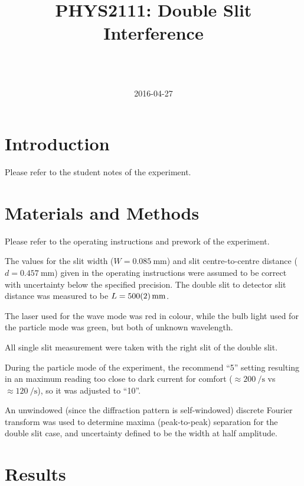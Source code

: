 \documentclass[a4paper]{scrartcl}
\begin{document}
\title{PHYS2111: Double Slit Interference}
\author{ \\ \\ }
\date{2016-04-27}
\maketitle

\section{Introduction}
Please refer to the student notes of the experiment.

\section{Materials and Methods}
Please refer to the operating instructions and prework of the experiment.

The values for the slit width (\(W = \SI{0.085}{\milli\metre}\)) and slit centre-to-centre distance (\(d = \SI{0.457}{\milli\metre}\)) given in the operating instructions were assumed to be correct with uncertainty below the specified precision. The double slit to detector slit distance was measured to be \(L = \SI{500 \pm 2}{\milli\metre}\).

The laser used for the wave mode was red in colour, while the bulb light used for the particle mode was green, but both of unknown wavelength.

All single slit measurement were taken with the right slit of the double slit.

During the particle mode of the experiment, the recommend ``5'' setting resulting in an maximum reading too close to dark current for comfort (\(\approx\SI{200}{\per\second}\) vs \(\approx\SI{120}{\per\second}\)), so it was adjusted to ``10''.

An unwindowed (since the diffraction pattern is self-windowed) discrete Fourier transform was used to determine maxima (peak-to-peak) separation for the double slit case, and uncertainty defined to be the width at half amplitude.

\section{Results}
\end{document}

